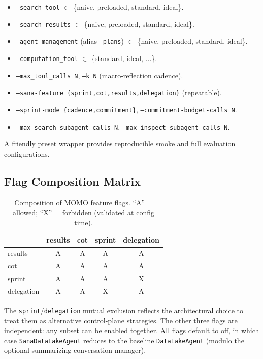 \begin{itemize}
\item \texttt{--search\_tool} $\in$ \{naive, preloaded, standard, ideal\}.
\item \texttt{--search\_results} $\in$ \{naive, preloaded, standard, ideal\}.
\item \texttt{--agent\_management} (alias \texttt{--plans}) $\in$ \{naive, preloaded, standard, ideal\}.
\item \texttt{--computation\_tool} $\in$ \{standard, ideal, $\ldots$\}.
\item \texttt{--max\_tool\_calls N}, \texttt{--k N} (macro-reflection cadence).
\item \texttt{--sana-feature \{sprint,cot,results,delegation\}} (repeatable).
\item \texttt{--sprint-mode \{cadence,commitment\}}, \texttt{--commitment-budget-calls N}.
\item \texttt{--max-search-subagent-calls N}, \texttt{--max-inspect-subagent-calls N}.
\end{itemize}

A friendly preset wrapper provides reproducible smoke and full evaluation configurations.

\subsection{Flag Composition Matrix}

\begin{table}[h]
\caption{Composition of MOMO feature flags. ``A'' = allowed; ``X'' = forbidden (validated at config time).}
\label{tab:flag-matrix}
\centering
\begin{tabular}{lcccc}
\toprule
 & results & cot & sprint & delegation \\
\midrule
results     & A & A & A & A \\
cot         & A & A & A & A \\
sprint      & A & A & A & X \\
delegation  & A & A & X & A \\
\bottomrule
\end{tabular}
\end{table}

The \texttt{sprint}/\texttt{delegation} mutual exclusion reflects the architectural choice to treat them as alternative control-plane strategies. The other three flags are independent: any subset can be enabled together. All flags default to off, in which case \texttt{SanaDataLakeAgent} reduces to the baseline \texttt{DataLakeAgent} (modulo the optional summarizing conversation manager).
